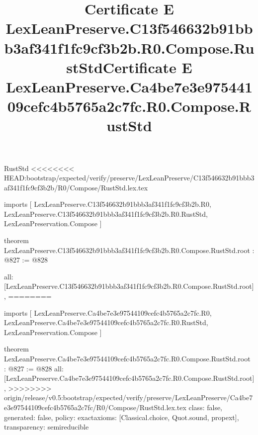 \begin{lexlean}{RustStd}
<<<<<<<< HEAD:bootstrap/expected/verify/preserve/LexLeanPreserve/C13f546632b91bbb3af341f1fc9cf3b2b/R0/Compose/RustStd.lex.tex
\title{Certificate E LexLeanPreserve.C13f546632b91bbb3af341f1fc9cf3b2b.R0.Compose.RustStd}
\begin{coremodule}
imports [
  LexLeanPreserve.C13f546632b91bbb3af341f1fc9cf3b2b.R0,
  LexLeanPreserve.C13f546632b91bbb3af341f1fc9cf3b2b.R0.RustStd,
  LexLeanPreservation.Compose
]

theorem LexLeanPreserve.C13f546632b91bbb3af341f1fc9cf3b2b.R0.Compose.RustStd.root : @827 := @828 {
  all: [LexLeanPreserve.C13f546632b91bbb3af341f1fc9cf3b2b.R0.Compose.RustStd.root],
========
\title{Certificate E LexLeanPreserve.Ca4be7e3e97544109cefc4b5765a2c7fc.R0.Compose.RustStd}
\begin{coremodule}
imports [
  LexLeanPreserve.Ca4be7e3e97544109cefc4b5765a2c7fc.R0,
  LexLeanPreserve.Ca4be7e3e97544109cefc4b5765a2c7fc.R0.RustStd,
  LexLeanPreservation.Compose
]

theorem LexLeanPreserve.Ca4be7e3e97544109cefc4b5765a2c7fc.R0.Compose.RustStd.root : @827 := @828 {
  all: [LexLeanPreserve.Ca4be7e3e97544109cefc4b5765a2c7fc.R0.Compose.RustStd.root],
>>>>>>>> origin/release/v0.5:bootstrap/expected/verify/preserve/LexLeanPreserve/Ca4be7e3e97544109cefc4b5765a2c7fc/R0/Compose/RustStd.lex.tex
  class: false,
  generated: false,
  policy: exact{axioms: [Classical.choice, Quot.sound, propext]},
  transparency: semireducible
}


\end{coremodule}}
\end{coremodule}
\end{lexlean}
